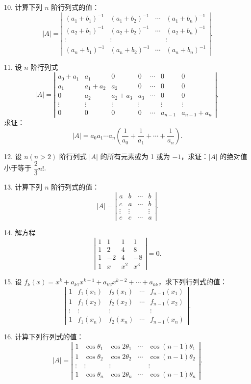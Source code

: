 \documentclass[UTF8, 12pt, fontset=fandol, oneside]{ctexart}
\begin{document}
10. 计算下列 $n$ 阶行列式的值：
\[
|A|=
\left|\begin{array}{cccc}
(a_1+b_1)^{-1}&(a_1+b_2)^{-1}&\cdots&(a_1+b_n)^{-1}\\
(a_2+b_1)^{-1}&(a_2+b_2)^{-1}&\cdots&(a_2+b_n)^{-1}\\
\vdots&\vdots&&\vdots\\
(a_n+b_1)^{-1}&(a_n+b_2)^{-1}&\cdots&(a_n+b_n)^{-1}
\end{array}\right|.
\]

11. 设 $n$ 阶行列式
\[
|A|=
\left|\begin{array}{ccccccc}
a_0+a_1&a_1&0&0&\cdots&0&0\\
a_1&a_1+a_2&a_2&0&\cdots&0&0\\
0&a_2&a_2+a_3&a_3&\cdots&0&0\\
\vdots&\vdots&\vdots&\vdots&&\vdots&\vdots\\
0&0&0&0&\cdots&a_{n-1}&a_{n-1}+a_n
\end{array}\right|,
\]
求证：
\[
|A|=a_0a_1\cdots a_n\left(\frac{1}{a_0}+\frac{1}{a_1}+\cdots+\frac{1}{a_n}\right).
\]

12. 设 $n(n>2)$ 阶行列式 $|A|$ 的所有元素或为 1 或为 $-1$，求证：$|A|$ 的绝对值小于等于 $\dfrac{2}{3}n!$.

13. 计算下列 $n$ 阶行列式的值：
\[
|A|=
\left|\begin{array}{cccc}
a&b&\cdots&b\\
c&a&\cdots&b\\
\vdots&\vdots&&\vdots\\
c&c&\cdots&a
\end{array}\right|.
\]

14. 解方程
\[
\left|\begin{array}{cccc}
1&1&1&1\\
1&2&4&8\\
1&-2&4&-8\\
1&x&x^2&x^3
\end{array}\right|=0.
\]

15. 设 $f_k(x)=x^k+a_{k1}x^{k-1}+a_{k2}x^{k-2}+\cdots+a_{kk}$，求下列行列式的值：
\[
\left|\begin{array}{ccccc}
1&f_1(x_1)&f_2(x_1)&\cdots&f_{n-1}(x_1)\\
1&f_1(x_2)&f_2(x_2)&\cdots&f_{n-1}(x_2)\\
\vdots&\vdots&\vdots&&\vdots\\
1&f_1(x_n)&f_2(x_n)&\cdots&f_{n-1}(x_n)
\end{array}\right|.
\]

16. 计算下列行列式的值：
\[
|A|=
\left|\begin{array}{ccccc}
1&\cos\theta_1&\cos2\theta_1&\cdots&\cos(n-1)\theta_1\\
1&\cos\theta_2&\cos2\theta_2&\cdots&\cos(n-1)\theta_2\\
\vdots&\vdots&\vdots&&\vdots\\
1&\cos\theta_n&\cos2\theta_n&\cdots&\cos(n-1)\theta_n
\end{array}\right|.
\]
\end{document}
